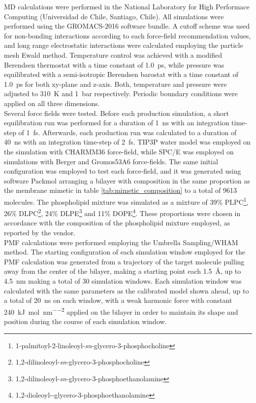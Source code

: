 \documentclass[3p,preprint,review]{elsarticle}
\begin{document}
	MD calculations were performed in the National Laboratory for High Performace
	Computing (Universidad de Chile, Santiago, Chile).
	All simulations were performed using the GROMACS-2016\cite{Abraham2015}
	software
	bundle. A cutoff scheme was used for non-bonding interactions according to each
	force-field recommendation values, and long range electrostatic interactions
	were calculated employing the particle mesh Ewald method\cite{DiPierro2015}.
	Temperature control was achieved with a modified Berendsen
	thermostat\cite{Bussi2007} with a time constant of \SI{1.0}{ps}, while pressure
	was equilibrated with a semi-isotropic Berendsen barostat\cite{Berendsen1984}
	with a time constant of \SI{1.0}{ps} for both xy-plane and z-axis. Both,
	temperature and pressure were adjusted to \SI{310}{K} and \SI{1}{bar}
	respectively. Periodic
	boundary conditions were applied on all three dimensions.\\ Several force
	fields were tested.
	Before each production simulation, a short equilibration run was performed for
	a
	duration of \SI{1}{ns} with an integration time-step of \SI{1}{fs}. Afterwards,
	each production run was calculated to a duration of \SI{40}{ns} with an
	integration time-step of \SI{2}{fs}. TIP3P water
	model\cite{Neria1996,Jorgensen1983} was employed on the
	simulation with CHARMM36 force-field, while SPC/E\cite{Berendsen1987} was
	employed on simulations
	with Berger and Gromos53A6 force-fields. The same initial configuration was
	employed to test each force-field, and it was generated using software
	Packmol\cite{Martinez2009} arranging a bilayer with composition in the same
	proportion as the membrane mimetic in table \ref{tab:mimetic_composition} to a
	total of 9613 molecules. The phospholipid mixture was simulated as a mixture of
	39\%
	PLPC\footnote{1-palmitoyl-2-linoleoyl-\textit{sn}-glycero-3-phosphocholine},
	26\% DLPC\footnote{1,2-dilinoleoyl-\textit{sn}-glycero-3-phosphocholine}, 24\%
	DLPE\footnote{1,2-dilinoleoyl-\textit{sn}-glycero-3-phosphoethanolamine} and
	11\% DOPE\footnote{1,2-dioleoyl--glycero-3-phosphoethanolamine}. These
	proportions were chosen in accordance with the composition of the phospholipid
	mixture employed, as
	reported by the vendor.\\
	PMF calculations were performed employing the Umbrella Sampling/WHAM
	method\cite{Kumar1992}. The starting configuration of each simulation window
	employed for the PMF calculation was generated from a trajectory of the target
	molecule pulling away from the center of the bilayer, making a starting point
	each \SI{1.5}{\angstrom}, up to \SI{4.5}{nm} making a total of 30 simulation
	windows. Each simulation window was calculated with the same parameters as the
	calibrated model shown ahead, up to a total of \SI{20}{ns} on each window, with
	a weak harmonic force with constant
	\SI{240}{\kilo\joule\per\mole\per\nano\meter\squared} applied on the bilayer
	in order to maintain its shape and position during the course of each
	simulation window.\\
	
\end{document}
